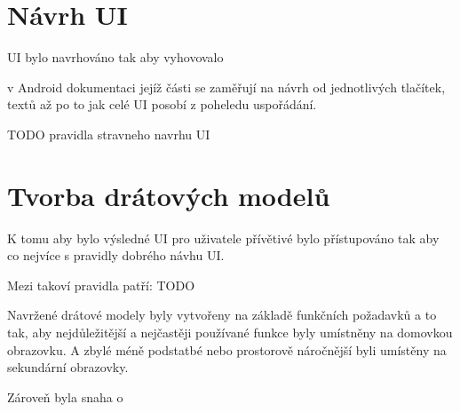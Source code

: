 \section{Návrh UI}
UI bylo navrhováno tak aby vyhovovalo 

v Android dokumentaci jejíž části se zaměřují na návrh od jednotlivých tlačítek, textů až po to jak celé UI posobí z poheledu
uspořádání.



TODO pravidla stravneho navrhu UI

\section{Tvorba drátových modelů}
K tomu aby bylo výsledné UI pro uživatele přívětivé bylo přístupováno tak aby co nejvíce  s pravidly dobrého návhu UI.

Mezi takoví pravidla patří:
TODO

Navržené drátové modely byly vytvořeny na základě funkčních požadavků a to tak, aby nejdůležitější a nejčastěji používané funkce byly 
umístněny na domovkou obrazovku. A zbylé méně podstatbé nebo prostorově náročnější byli umístěny na sekundární obrazovky.

Zároveň byla snaha o 

